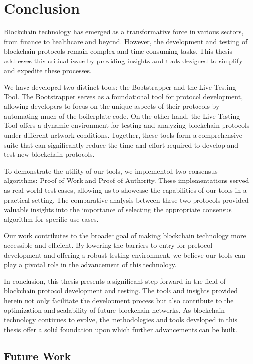 \chapter{Conclusion}

Blockchain technology has emerged as a transformative force in various sectors, from finance to healthcare and beyond. However, the development and testing of blockchain protocols remain complex and time-consuming tasks. This thesis addresses this critical issue by providing insights and tools designed to simplify and expedite these processes.

We have developed two distinct tools: the Bootstrapper and the Live Testing Tool. The Bootstrapper serves as a foundational tool for protocol development, allowing developers to focus on the unique aspects of their protocols by automating much of the boilerplate code. On the other hand, the Live Testing Tool offers a dynamic environment for testing and analyzing blockchain protocols under different network conditions. Together, these tools form a comprehensive suite that can significantly reduce the time and effort required to develop and test new blockchain protocols.

To demonstrate the utility of our tools, we implemented two consensus algorithms: Proof of Work and Proof of Authority. These implementations served as real-world test cases, allowing us to showcase the capabilities of our tools in a practical setting. The comparative analysis between these two protocols provided valuable insights into the importance of selecting the appropriate consensus algorithm for specific use-cases.

Our work contributes to the broader goal of making blockchain technology more accessible and efficient. By lowering the barriers to entry for protocol development and offering a robust testing environment, we believe our tools can play a pivotal role in the advancement of this technology.

In conclusion, this thesis presents a significant step forward in the field of blockchain protocol development and testing. The tools and insights provided herein not only facilitate the development process but also contribute to the optimization and scalability of future blockchain networks. As blockchain technology continues to evolve, the methodologies and tools developed in this thesis offer a solid foundation upon which further advancements can be built.

\section{Future Work}

